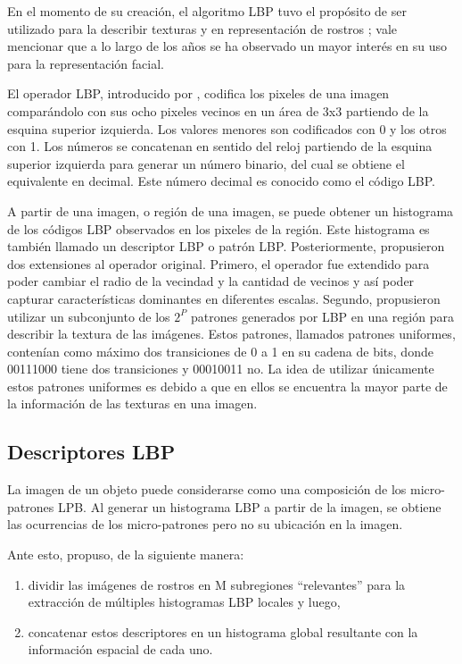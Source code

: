 En el momento de su creación, el algoritmo LBP tuvo el propósito de ser utilizado para la describir texturas y en representación de rostros \cite{Ahonen2006-gg}; vale mencionar que a lo largo de los años se ha observado un mayor interés en su uso para la representación facial.

El operador LBP, introducido por \cite{Ojala1996-el}, codifica los pixeles de una imagen comparándolo con sus ocho pixeles vecinos en un área de 3x3 partiendo de la esquina superior izquierda. Los valores menores son codificados con 0 y los otros con 1. Los números se concatenan en sentido del reloj partiendo de la esquina superior izquierda para generar un número binario, del cual se obtiene el equivalente en decimal. Este número decimal es conocido como el código LBP. 

A partir de una imagen, o región de una imagen, se puede obtener un histograma de los códigos LBP observados en los pixeles de la región. Este histograma es también llamado un descriptor LBP o patrón LBP.
Posteriormente, \cite{Ojala2002-pl} propusieron dos extensiones al operador original. Primero, el operador fue extendido para poder cambiar el radio de la vecindad y la cantidad de vecinos y así poder capturar características dominantes en diferentes escalas. Segundo, propusieron utilizar un subconjunto de los $2^P$ patrones generados por LBP en una región para describir la textura de las imágenes. Estos patrones, llamados patrones uniformes, contenían como máximo dos transiciones de 0 a 1 en su cadena de bits, donde 00111000 tiene dos transiciones y 00010011 no. La idea de utilizar únicamente estos patrones uniformes es debido a que en ellos se encuentra la mayor parte de la información de las texturas en una imagen. 

\subsection{Descriptores LBP}
La imagen de un objeto puede considerarse como una composición de los micro-patrones LPB. Al generar un histograma LBP a partir de la imagen, se obtiene las ocurrencias de los micro-patrones pero no su ubicación en la imagen. 

Ante esto, \cite{Ahonen2006-gg} propuso, de la siguiente manera:
\begin{enumerate}
    \item dividir las imágenes de rostros en M subregiones “relevantes” para la extracción de múltiples histogramas LBP locales y luego, 
    \item concatenar estos descriptores en un histograma global resultante con la información espacial de cada uno.

\end{enumerate}


